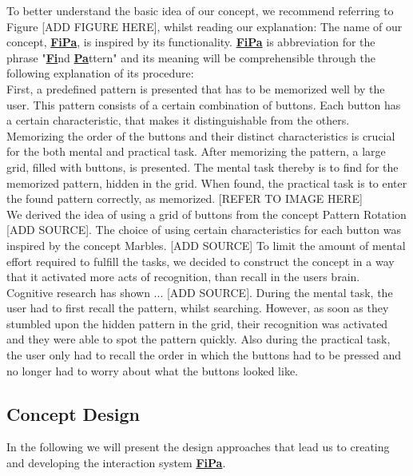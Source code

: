 To better understand the basic idea of our concept, we recommend referring to Figure [ADD FIGURE HERE], whilst reading our explanation: 
The name of our concept, \underline{\textbf{FiPa}}, is inspired by its functionality. \underline{\textbf{FiPa}} is abbreviation for the phrase "\underline{\textbf{Fi}}nd \underline{\textbf{Pa}}ttern" and its meaning will be comprehensible through the following explanation of its procedure: \\
First, a predefined pattern is presented that has to be memorized well by the user. This pattern consists of a certain combination of buttons. Each button has a certain characteristic, that makes it distinguishable from the others. Memorizing the order of the buttons and their distinct characteristics is crucial for the both mental and practical task. After memorizing the pattern, a large grid, filled with buttons, is presented. The mental task thereby is to find for the memorized pattern, hidden in the grid. When found, the practical task is to enter the found pattern correctly, as memorized. [REFER TO IMAGE HERE]\\

We derived the idea of using a grid of buttons from the concept Pattern Rotation [ADD SOURCE]. The choice of using certain characteristics for each button was inspired by the concept Marbles. [ADD SOURCE] To limit the amount of mental effort required to fulfill the tasks, we decided to construct the concept in a way that it activated more acts of recognition, than recall in the users brain. Cognitive research has shown ... [ADD SOURCE]. During the mental task, the user had to first recall the pattern, whilst searching. However, as soon as they stumbled upon the hidden pattern in the grid, their recognition was activated and they were able to spot the pattern quickly. Also during the practical task, the user only had to recall the order in which the buttons had to be pressed and no longer had to worry about what the buttons looked like. 

\subsection{Concept Design}
In the following we will present the design approaches that lead us to creating and developing the interaction system \underline{\textbf{FiPa}}.

